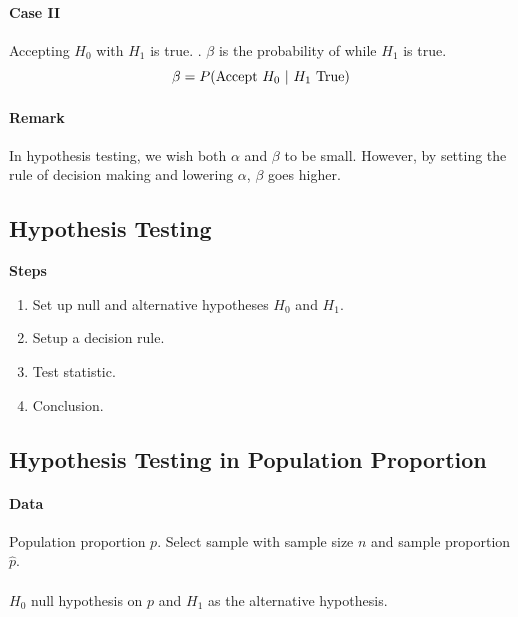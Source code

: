 \documentclass{article}
\begin{document}
			\paragraph{Case II} Accepting $H_0$ with $H_1$ is true. . $\beta$ is the probability of  while $H_1$ is true.
				\[
					\beta = P(\tx{Accept }H_0\ \vert \ H_1 \tx{ True})
				\]
			\paragraph{Remark} In hypothesis testing, we wish both $\alpha$ and $\beta$ to be small. However, by setting the rule of decision making and lowering $\alpha$, $\beta$ goes higher.
		\subsection{Hypothesis Testing}
			\textbf{Steps}
			\begin{enumerate}
				\item Set up null and alternative hypotheses $H_0$ and $H_1$.
				\item Setup a decision rule.
				\item Test statistic.
				\item Conclusion.
			\end{enumerate}
			
		\subsection{Hypothesis Testing in Population Proportion}
			\paragraph{Data} Population proportion $p$. Select sample with sample size $n$ and sample proportion $\hat{p}$.
			\paragraph{} $H_0$ null hypothesis on $p$ and $H_1$ as the alternative hypothesis.
			
\end{document}

